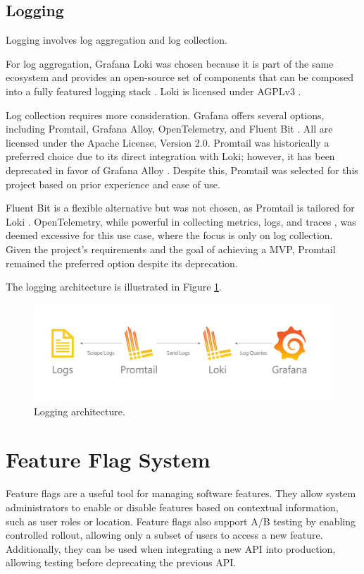 \subsection{Logging}
Logging involves log aggregation and log collection.

For log aggregation, Grafana Loki was chosen because it is part of the same ecosystem and provides an open-source set of components that can be composed into a fully featured logging stack \parencite{grafana_loki}. Loki is licensed under AGPLv3 \Parencite{grafana_loki_license}.

Log collection requires more consideration. Grafana offers several options, including Promtail, Grafana Alloy, OpenTelemetry, and Fluent Bit \Parencite{grafana_loki_send_data}. All are licensed under the Apache License, Version 2.0. Promtail was historically a preferred choice due to its direct integration with Loki; however, it has been deprecated in favor of Grafana Alloy \Parencite{grafana_promtail}. Despite this, Promtail was selected for this project based on prior experience and ease of use.

Fluent Bit is a flexible alternative but was not chosen, as Promtail is tailored for Loki \Parencite{grafana_loki_send_data}. OpenTelemetry, while powerful in collecting metrics, logs, and traces \Parencite{opentelemetry_overview}, was deemed excessive for this use case, where the focus is only on log collection. Given the project's requirements and the goal of achieving a MVP, Promtail remained the preferred option despite its deprecation.

The logging architecture is illustrated in Figure \ref{fig:logging_architecture}.

\begin{figure}[h]
    \centering
    \includegraphics[width=1\textwidth]{./images/loki-promtail.png}
    \caption{Logging architecture.}
    \label{fig:logging_architecture}
\end{figure}

\section{Feature Flag System}
Feature flags are a useful tool for managing software features. They allow system administrators to enable or disable features based on contextual information, such as user roles or location. Feature flags also support A/B testing by enabling controlled rollout, allowing only a subset of users to access a new feature. Additionally, they can be used when integrating a new API into production, allowing testing before deprecating the previous API.

